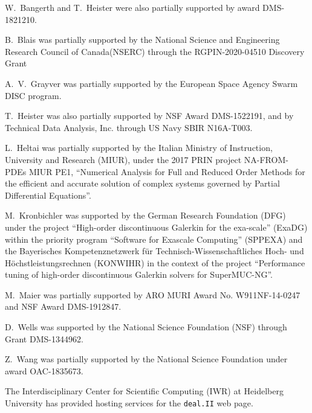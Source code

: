 \documentclass{ansarticle-preprint}
\newcommand{\specialword}[1]{\texttt{#1}}
\newcommand{\dealii}{{\specialword{deal.II}}\xspace}
\begin{document}
W.~Bangerth and T.~Heister were also partially supported by award DMS-1821210.


B.~Blais was partially supported by the National Science and Engineering Research Council of Canada(NSERC)  through the RGPIN-2020-04510 Discovery Grant

A.~V.~Grayver was partially supported by the European Space Agency
Swarm DISC program.

T.~Heister was also partially supported by NSF Award DMS-1522191, and
by Technical Data Analysis, Inc. through US Navy SBIR N16A-T003.

L.~Heltai was partially supported by the Italian Ministry of Instruction,
University and Research (MIUR), under the 2017 PRIN project NA-FROM-PDEs MIUR
PE1, ``Numerical Analysis for Full and Reduced Order Methods for the efficient
and accurate solution of complex systems governed by Partial Differential
Equations''.

M.~Kronbichler was supported by the German
Research Foundation (DFG) under the project ``High-order discontinuous
Galerkin for the exa-scale'' (\mbox{ExaDG}) within the priority program ``Software
for Exascale Computing'' (SPPEXA) and the Bayerisches Kompetenznetzwerk
f\"ur Technisch-Wissen\-schaft\-li\-ches Hoch- und H\"ochstleistungsrechnen
(KONWIHR) in the context of the project
``Performance tuning of high-order discontinuous Galerkin solvers for
SuperMUC-NG''.

M.~Maier was partially supported by ARO MURI Award No. W911NF-14-0247 and
NSF Award DMS-1912847.

D.~Wells was supported by the National Science Foundation (NSF) through Grant
DMS-1344962.

Z.~Wang was partially
supported by the National Science Foundation under award OAC-1835673.

The Interdisciplinary Center for Scientific Computing (IWR) at Heidelberg
University has provided hosting services for the \dealii{} web page.


{}

\end{document}
